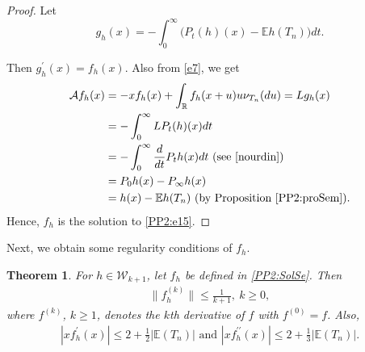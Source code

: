 \documentclass[12pt, a4paper,reqno]{amsart}
\newtheorem{thm}{Theorem}[section]
\theoremstyle{definition}
\theoremstyle{myremark}
\numberwithin{equation}{section}
\begin{document}
\vspace{-.3cm}
\begin{proof}
	Let
	 $$g_{h}(x)=-\displaystyle\int_{0}^{\infty}\bigg(P_{t}(h)(x)-\mathbb{E}h(T_n)  \bigg)dt .$$
	
	\noindent
	Then $g_{h}^{\prime}(x)=f_{h}(x).$ Also from \eqref{e7}, we get
	\begin{align}
	\nonumber\mathcal{A}f_{h}(x)&=-xf_{h}(x)+\int_{\mathbb{R}} f_{h}(x+u)u\nu_{T_n} (du)=Lg_{h}(x) \\
	\nonumber&=-\displaystyle\int_{0}^{\infty}LP_{t}(h)(x)dt\\
	\nonumber&=-\displaystyle\int_{0}^{\infty}\frac{d}{dt}P_{t}h(x)dt\text{ (see \cite[p.68]{nourdin})}\\
	\nonumber&=P_{0}h(x)-P_{\infty}h(x)\\
	\nonumber&=h(x)-\mathbb{E}h(T_n)~(\text{by Proposition \ref{PP2:proSem}}).
	\end{align}
	\noindent
	Hence, $f_{h}$ is the solution to \eqref{PP2:e15}. 	
\end{proof}
\vspace{-0.4cm}
\noindent
Next, we obtain some regularity conditions of $f_{h}$. 
\vspace{-0.4cm}
\begin{thm}\label{th3}
	For $h\in\mathcal{W}_{k+1}$, let $f_{h}$ be defined in \eqref{PP2:SolSe}. Then
	\begin{align}\label{PP2:pr1}
	\|f_{h}^{(k)}\|\leq \frac{1}{k+1} ,~k\geq 0,
	\end{align}	
	where $f^{(k)}$, $k\geq 1$, denotes the $k$th derivative of $f$ with $f^{(0)}=f$. Also,
	\begin{align}
		|xf_{h}^{\prime}(x)| \leq 2+\frac{1}{2}|\mathbb{E}(T_n)| \text{ and }|xf_{h}^{\prime\prime}(x)| \leq 2+\frac{1}{3}|\mathbb{E}(T_n)|.
	\end{align}
\end{thm}
\end{document}
